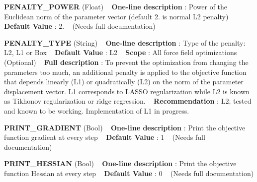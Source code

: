 \begin{DoxyItemize}
\item {\bfseries  P\+E\+N\+A\+L\+T\+Y\+\_\+\+P\+O\+W\+ER } (Float) ~\newline
{\bfseries  One-\/line description }\+: Power of the Euclidean norm of the parameter vector (default 2. is normal L2 penalty) ~\newline
{\bfseries  Default Value }\+: 2. ~\newline
(Needs full documentation)\end{DoxyItemize}
\begin{DoxyItemize}
\item {\bfseries  P\+E\+N\+A\+L\+T\+Y\+\_\+\+T\+Y\+PE } (String) ~\newline
{\bfseries  One-\/line description }\+: Type of the penalty\+: L2, L1 or Box ~\newline
{\bfseries  Default Value }\+: L2 ~\newline
{\bfseries  Scope }\+: All force field optimizations (Optional) ~\newline
{\bfseries  Full description }\+: To prevent the optimization from changing the parameters too much, an additional penalty is applied to the objective function that depends linearly (L1) or quadratically (L2) on the norm of the parameter displacement vector. L1 corresponds to L\+A\+S\+SO regularization while L2 is known as Tikhonov regularization or ridge regression. ~\newline
{\bfseries  Recommendation }\+: L2; tested and known to be working. Implementation of L1 in progress.\end{DoxyItemize}
\begin{DoxyItemize}
\item {\bfseries  P\+R\+I\+N\+T\+\_\+\+G\+R\+A\+D\+I\+E\+NT } (Bool) ~\newline
{\bfseries  One-\/line description }\+: Print the objective function gradient at every step ~\newline
{\bfseries  Default Value }\+: 1 ~\newline
(Needs full documentation)\end{DoxyItemize}
\begin{DoxyItemize}
\item {\bfseries  P\+R\+I\+N\+T\+\_\+\+H\+E\+S\+S\+I\+AN } (Bool) ~\newline
{\bfseries  One-\/line description }\+: Print the objective function Hessian at every step ~\newline
{\bfseries  Default Value }\+: 0 ~\newline
(Needs full documentation)\end{DoxyItemize}
